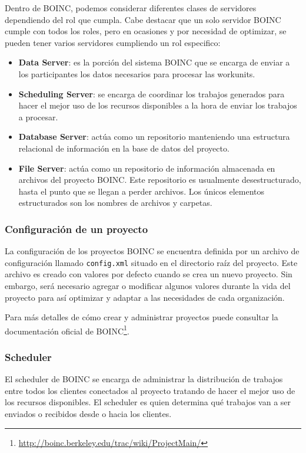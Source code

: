 Dentro de BOINC, podemos considerar diferentes clases de servidores \linebreak dependiendo del rol que cumpla. Cabe destacar que un solo servidor BOINC cumple con todos los roles, pero en ocasiones y por necesidad de optimizar, se pueden tener varios servidores cumpliendo un rol especifico:

\begin{itemize}
\item \textbf{Data Server}: es la porción del sistema BOINC que se encarga de enviar a los participantes los datos necesarios para procesar las workunits.
\item \textbf{Scheduling Server}: se encarga de coordinar los trabajos generados para hacer el mejor uso de los recursos disponibles a la hora de enviar los trabajos a procesar.
\item \textbf{Database Server}: actúa como un repositorio manteniendo una estructura relacional de información en la base de datos del proyecto.
\item \textbf{File Server}: actúa como un repositorio de información almacenada en archivos del proyecto BOINC. Este repositorio es usualmente desestructurado, hasta el punto que se llegan a perder archivos. Los únicos elementos estructurados son los nombres de archivos y carpetas.
\end{itemize}

\subsubsection{Configuración de un proyecto}
\label{seccion:boinc:config:xml}
La configuración de los proyectos BOINC se encuentra definida por un archivo de configuración llamado \texttt{config.xml} situado en el directorio raíz del proyecto. Este archivo es creado con valores por defecto cuando se crea un nuevo proyecto. Sin embargo, será necesario agregar o modificar algunos valores durante la vida del proyecto para así optimizar y adaptar a las necesidades de cada organización.

Para más detalles de cómo crear y administrar proyectos puede consultar la documentación oficial de BOINC\footnote{\url{http://boinc.berkeley.edu/trac/wiki/ProjectMain/}}.

\subsubsection{Scheduler}

El scheduler de BOINC se encarga de administrar la distribución de trabajos entre todos los clientes conectados al proyecto tratando de hacer el mejor uso de los recursos disponibles. El scheduler es quien determina qué trabajos van a ser enviados o recibidos desde o hacia los clientes. 

